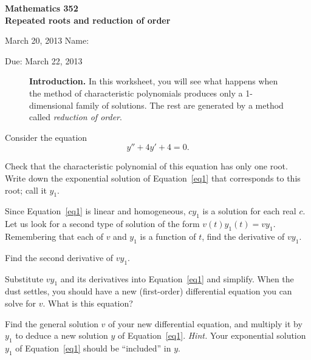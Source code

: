 \documentclass[11pt]{exam}
\begin{document}
\noindent
\textbf{{\large Mathematics 352 \\ Repeated roots and reduction of order}}

\noindent
March 20, 2013 \hfill Name: \underline{\hspace{3in}} 

\noindent
Due: March 22, 2013

\noindent
\begin{figure}[h]
\centering
\begin{minipage}[b]{0.85\linewidth}
\textbf{Introduction.} In this worksheet, you will see what happens when the method of characteristic polynomials produces only a 1-dimensional family of solutions. The rest are generated by a method called \emph{reduction of order}.
\end{minipage}
\end{figure}


Consider the equation
\begin{equation} \label{eq1}
    y'' + 4y' + 4 = 0.
\end{equation}
\begin{questions}  


\question Check that the characteristic polynomial of this equation has only one root. Write down the exponential solution of Equation~\ref{eq1} that corresponds to this root; call it $y_1$.


\question Since Equation~\ref{eq1} is linear and homogeneous, $cy_1$ is a solution for each real $c$. Let us look for a second type of solution of the form $v(t) y_1(t) = vy_1$. Remembering that each of $v$ and $y_1$ is a function of $t$, find the derivative of $vy_1$.


\question Find the second derivative of $vy_1$.


\newpage

\question Substitute $vy_1$ and its derivatives into Equation~\ref{eq1} and simplify. When the dust settles, you should have a new (first-order) differential equation you can solve for $v$. What is this equation?


\question Find the general solution $v$ of your new differential equation, and multiply it by $y_1$ to deduce a new solution $y$ of Equation~\ref{eq1}. \emph{Hint.} Your exponential solution $y_1$ of Equation~\ref{eq1} should be ``included'' in $y$.


\end{questions}
\end{document}

